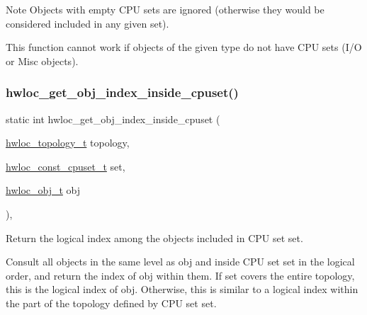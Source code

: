 \begin{DoxyNote}{Note}
Objects with empty C\+PU sets are ignored (otherwise they would be considered included in any given set).

This function cannot work if objects of the given type do not have C\+PU sets (I/O or Misc objects). 
\end{DoxyNote}
\mbox{\label{a00195_ga4c3a20d61e9beb06c667b21688c772c5}} 
\subsubsection{\texorpdfstring{hwloc\+\_\+get\+\_\+obj\+\_\+index\+\_\+inside\+\_\+cpuset()}{hwloc\_get\_obj\_index\_inside\_cpuset()}}
{\footnotesize\ttfamily static int hwloc\+\_\+get\+\_\+obj\+\_\+index\+\_\+inside\+\_\+cpuset (\begin{DoxyParamCaption}\item[{\hyperlink{a00186_ga9d1e76ee15a7dee158b786c30b6a6e38}{hwloc\+\_\+topology\+\_\+t}}]{topology,  }\item[{\hyperlink{a00183_ga1f784433e9b606261f62d1134f6a3b25}{hwloc\+\_\+const\+\_\+cpuset\+\_\+t}}]{set,  }\item[{\hyperlink{a00185_ga79b8ab56877ef99ac59b833203391c7d}{hwloc\+\_\+obj\+\_\+t}}]{obj }\end{DoxyParamCaption})\hspace{0.3cm}{\ttfamily [inline]}, {\ttfamily [static]}}



Return the logical index among the objects included in C\+PU set {\ttfamily set}. 

Consult all objects in the same level as {\ttfamily obj} and inside C\+PU set {\ttfamily set} in the logical order, and return the index of {\ttfamily obj} within them. If {\ttfamily set} covers the entire topology, this is the logical index of {\ttfamily obj}. Otherwise, this is similar to a logical index within the part of the topology defined by C\+PU set {\ttfamily set}.

